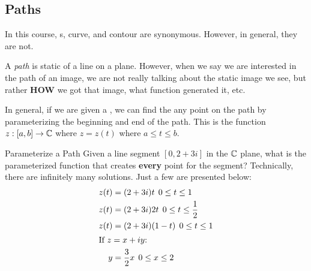 \subsection{Paths}\label{subsec:Paths}
In this course, s, curve, and contour are synonymous.
However, in general, they are not.

\begin{definition}[Path]\label{def:Path}
  A \emph{path} is static  of a line on a plane.
  However, when we say we are interested in the path of an image, we are not really talking about the static image we see, but rather \textbf{HOW} we got that image, what function generated it, etc.
\end{definition}

In general, if we are given a , we can find the any point on the path by parameterizing the beginning and end of the path.
This is the function $z: [a, b] \to \operatorname{\mathbb{C}}$ where $z = z(t)$ where $a \leq t \leq b$.

\begin{example}{Parameterize a Path}
  Given a line segment $[0, 2+3i]$ in the $\operatorname{\mathbb{C}}$ plane, what is the parameterized function that creates \textbf{every} point for the segment?
  \tcblower{}
  Technically, there are infinitely many solutions.
  Just a few are presented below:
  \begin{align*}
    z(t) &= (2 + 3i)t \:\: 0 \leq t \leq 1 \\
    z(t) &= (2 + 3i)2t \:\: 0 \leq t \leq \frac{1}{2} \\
    z(t) &= (2 + 3i)(1-t) \:\: 0 \leq t \leq 1 \\
    \shortintertext{If $z = x + iy$:}
    y &= \frac{3}{2} x \:\: 0 \leq x \leq 2
  \end{align*}
\end{example}



